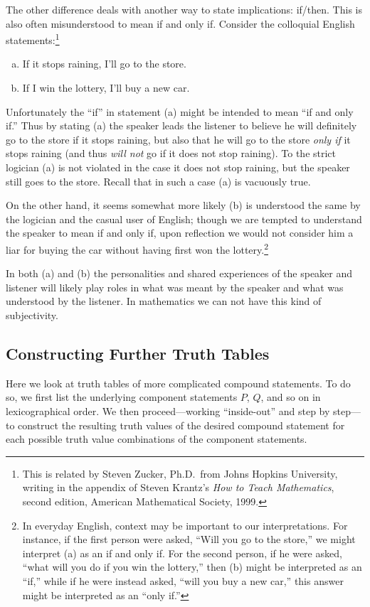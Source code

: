 The other difference deals with another way to state implications:
if/then.  This is
also often misunderstood to mean if and only if.
Consider the colloquial English statements:\footnote{
This is related by Steven Zucker, Ph.D.\ from Johns Hopkins
University, writing in the appendix of Steven Krantz's 
{\it How to Teach Mathematics}, second edition, 
American Mathematical Society, 1999.
}  
\begin{enumerate}[(a)]
\item If it stops raining, I'll go to the store.
\item If I win the lottery, I'll buy a new car.
\end{enumerate}

Unfortunately the ``if'' in  statement (a) might be intended to mean
``if and only if.'' Thus by stating (a) the speaker leads
the listener to believe  he  will definitely go to the 
store if it stops raining, but also that he  will go to
the store {\it only if} it stops raining (and thus
{\it will not} go if it does not stop raining).
To the strict logician 
(a) is not violated in the case it does not stop
raining, but the speaker still goes to the store. Recall that
in such a case (a) is vacuously true.

On the other hand, it seems somewhat more likely (b) is understood
the same by the logician and the casual user of English;
though we are tempted to understand the speaker to 
mean if and only if, upon reflection
we would not consider him a liar
for buying the car without having first won the lottery.\footnote{
In everyday English,
context may be important to our interpretations.  For instance, 
if the first person were asked, ``Will you go to the store,''
we might interpret (a) as an if and only if.  For the second
person, if he were asked, ``what will you do if you win the lottery,''
then (b) might be interpreted as an ``if,'' while if he were instead
asked, ``will you buy a new car,'' this answer might be interpreted
as an ``only if.'' 
} 

In both (a) and (b) the personalities and shared experiences of 
the speaker and listener will likely play roles in 
what was meant by the speaker and what was understood
by the listener.  In mathematics we can not
have this kind of subjectivity. 
\subsection{Constructing Further Truth Tables}
Here we look at truth tables of more complicated compound
statements.  To do so, we first list the underlying 
component statements $P$, $Q$, and so on in lexicographical
order.  We then proceed---working ``inside-out'' and
step by step---to construct
the resulting truth values of the desired compound statement
for each possible truth value combinations of the component
statements.


